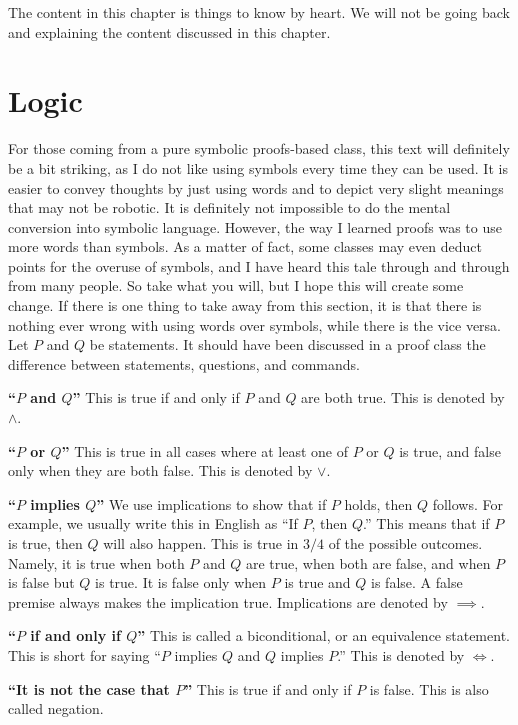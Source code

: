 
The content in this chapter is things to know by heart.
We will not be going back and explaining the content discussed in this chapter.

\section{Logic}

For those coming from a pure symbolic proofs-based class, this text will definitely be a bit striking, as I do not like using symbols every time they can be used.
It is easier to convey thoughts by just using words and to depict very slight meanings that may not be robotic.
It is definitely not impossible to do the mental conversion into symbolic language.
However, the way I learned proofs was to use more words than symbols.
As a matter of fact, some classes may even deduct points for the overuse of symbols, and I have heard this tale through and through from many people.
So take what you will, but I hope this will create some change.
If there is one thing to take away from this section, it is that there is nothing ever wrong with using words over symbols, while there is the vice versa.
Let $P$ and $Q$ be statements.
It should have been discussed in a proof class the difference between statements, questions, and commands.

\begin{definition}
    \textbf{``$P$ and $Q$''}
    This is true if and only if $P$ and $Q$ are both true.
    This is denoted by $\land$.

    \textbf{``$P$ or $Q$''}
    This is true in all cases where at least one of $P$ or $Q$ is true, and false only when they are both false.
    This is denoted by $\lor$.

    \textbf{``$P$ implies $Q$''}
    We use implications to show that if $P$ holds, then $Q$ follows.
    For example, we usually write this in English as ``If $P$, then $Q$.''
    This means that if $P$ is true, then $Q$ will also happen.
    This is true in $3/4$ of the possible outcomes.
    Namely, it is true when both $P$ and $Q$ are true, when both are false, and when $P$ is false but $Q$ is true.
    It is false only when $P$ is true and $Q$ is false.
    A false premise always makes the implication true.
    Implications are denoted by $\implies$.

    \textbf{``$P$ if and only if $Q$''}
    This is called a biconditional, or an equivalence statement.
    This is short for saying ``$P$ implies $Q$ and $Q$ implies $P$.''
    This is denoted by $\iff$.

    \textbf{``It is not the case that $P$''}
    This is true if and only if $P$ is false.
    This is also called negation.
\end{definition}